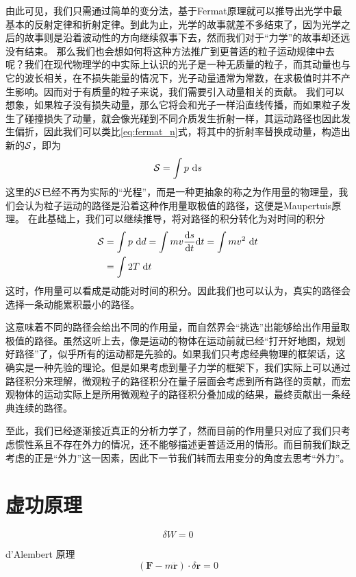 \documentclass[12pt,openany]{book}
\begin{document}
由此可见，我们只需通过简单的变分法，基于Fermat原理就可以推导出光学中最基本的反射定律和折射定律。到此为止，光学的故事就差不多结束了，因为光学之后的故事则是沿着波动性的方向继续叙事下去，然而我们对于“力学”的故事却还远没有结束。
那么我们也会想如何将这种方法推广到更普适的粒子运动规律中去呢？我们在现代物理学的中实际上认识的光子是一种无质量的粒子，而其动量也与它的波长相关，在不损失能量的情况下，光子动量通常为常数，在求极值时并不产生影响。因而对于有质量的粒子来说，我们需要引入动量相关的贡献。
我们可以想象，如果粒子没有损失动量，那么它将会和光子一样沿直线传播，而如果粒子发生了碰撞损失了动量，就会像光碰到不同介质发生折射一样，其运动路径也因此发生偏折，因此我们可以类比\eqref{eq:fermat_n}式，将其中的折射率替换成动量，构造出新的$\mathcal{S}$，即为
\begin{equation}
   \mathcal{S} =\int p~\mathrm{d}s
\end{equation}
这里的$\mathcal{S}$已经不再为实际的“光程”，而是一种更抽象的称之为作用量的物理量，我们会认为粒子运动的路径是沿着这种作用量取极值的路径，这便是Maupertuis原理。
在此基础上，我们可以继续推导，将对路径的积分转化为对时间的积分
\begin{equation}
   \begin{split}
   \mathcal{S} &= \int p~\mathrm{d} d = \int mv \frac{\mathrm{d} s}{\mathrm{d} t}\mathrm{d} t = \int mv^2 ~\mathrm{d} t\\&=\int 2 T~\mathrm{d} t
   \end{split}
\end{equation}
这时，作用量可以看成是动能对时间的积分。因此我们也可以认为，真实的路径会选择一条动能累积最小的路径。

这意味着不同的路径会给出不同的作用量，而自然界会“挑选”出能够给出作用量取极值的路径。虽然这听上去，像是运动的物体在运动前就已经“打开好地图，规划好路径”了，似乎所有的运动都是先验的。如果我们只考虑经典物理的框架话，这确实是一种先验的理论。但是如果考虑到量子力学的框架下，我们实际上可以通过路径积分来理解，微观粒子的路径积分在量子层面会考虑到所有路径的贡献，而宏观物体的运动实际上是所用微观粒子的路径积分叠加成的结果，最终贡献出一条经典连续的路径。

至此，我们已经逐渐接近真正的分析力学了，然而目前的作用量只对应了我们只考虑惯性系且不存在外力的情况，还不能够描述更普适泛用的情形。而目前我们缺乏考虑的正是“外力”这一因素，因此下一节我们转而去用变分的角度去思考“外力”。

\section{虚功原理}

\begin{equation}
   \delta W = 0
\end{equation}

d'Alembert 原理
\begin{equation}
   (\boldsymbol{F} - m\ddot{\boldsymbol{r}})\cdot\delta\boldsymbol{r}=0
\end{equation}




\appendix







\backmatter


\end{document}
